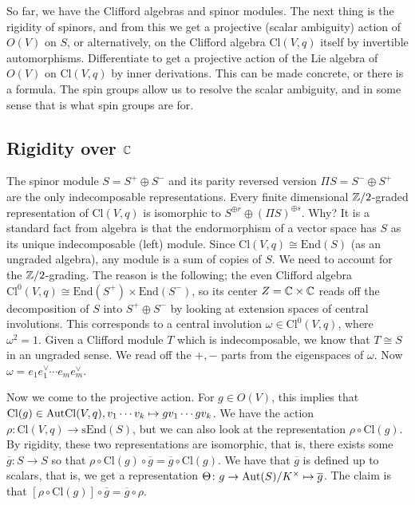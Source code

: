 So far, we have the Clifford algebras and spinor modules. The next thing is the rigidity of spinors, and from this we get a projective (scalar ambiguity) action of $O(V)$ on $S$, or alternatively, on the Clifford algebra $\mathrm{Cl}(V,q)$ itself by invertible automorphisms. Differentiate to get a projective action of the Lie algebra of $O(V)$ on $\mathrm{Cl}(V,q)$ by inner derivations. This can be made concrete, or there is a formula. The spin groups allow us to resolve the scalar ambiguity, and in some sense that is what spin groups are for.

\subsection{Rigidity over $\mathbb{C}$}
The spinor module $S = S^+ \oplus S^- $ and its parity reversed version $\Pi S = S^- \oplus S^+$ are the only indecomposable representations. Every finite dimensional $\mathbb{Z}/2$-graded representation of $\mathrm{Cl}(V,q)$ is isomorphic to $S ^{\oplus r}\oplus \left( \Pi S \right) ^{\oplus s}$. Why? It is a standard fact from algebra is that the endormorphism of a vector space has  $S$ as its unique indecomposable (left) module. Since $\mathrm{Cl}(V,q) \cong  \mathrm{End}(S)$ (as an ungraded algebra), any module is a sum of copies of $S$. We need to account for the $\mathbb{Z} /2$-grading. The reason is the following; the even Clifford algebra $\mathrm{Cl}^0 (V,q) \cong  \mathrm{End}(S^+) \times \mathrm{End}(S^-)$, so its center $Z = \mathbb{C} \times \mathbb{C}$ reads off the decomposition of $S$ into $S^+ \oplus S^-$ by looking at extension spaces of central involutions. 
This corresponds to a central involution $\omega \in \mathrm{Cl}^0(V,q)$, where $\omega^2= 1$. Given a Clifford module $T$ which is indecomposable, we know that $T \cong  S$ in an ungraded sense. We read off the $+,-$ parts from the eigenspaces of $\omega$. Now $\omega = e_1 e_1^{\vee} \cdots e_m e_m^{\vee}$.

Now we come to the projective action. For $g \in O(V)$, this implies that $\mathrm{Cl}(g) \in \mathrm{Aut}  \mathrm{Cl}(V,q),  v_1 \cdots v_k \mapsto  gv_1 \cdots gv_k$. We have the action $\rho \colon \mathrm{Cl}(V,q) \to \mathrm{sEnd}(S)$, but we can also look at the representation $\rho \circ \mathrm{Cl}(g)$. By rigidity, these two representations are isomorphic, that is, there exists some $\overline{g} \colon S \to S$ so that $\rho \circ \mathrm{Cl}(g) \circ \overline{g} = \overline{g} \circ \mathrm{Cl}(g)$. We have that $\overline{g}$ is defined up to scalars, that is, we get a representation $\Theta \colon  g \to \mathrm{Aut}(S) / K ^{\times }  \mapsto \overline{g} $. The claim is that $[\rho \circ \mathrm{Cl}(g) ] \circ \overline{g} = \overline{g} \circ \rho$.


